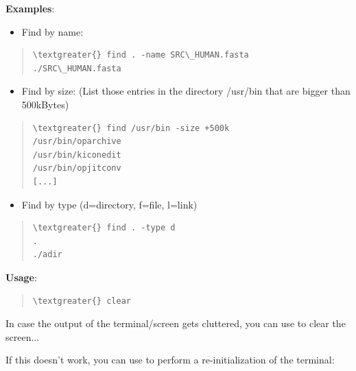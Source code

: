 \documentclass[letterpaper,10pt,english]{sphinxmanual}
\begin{document}
\textbf{Examples}:
\begin{itemize}
\item {} 
Find by name:

\end{itemize}
\begin{quote}

\begin{Verbatim}[commandchars=\\\{\}]
\textgreater{} find . -name SRC\_HUMAN.fasta
./SRC\_HUMAN.fasta
\end{Verbatim}
\end{quote}
\begin{itemize}
\item {} 
Find by size: (List those entries in the directory /usr/bin that are bigger than 500kBytes)

\end{itemize}
\begin{quote}

\begin{Verbatim}[commandchars=\\\{\}]
\textgreater{} find /usr/bin -size +500k
/usr/bin/oparchive
/usr/bin/kiconedit
/usr/bin/opjitconv
[...]
\end{Verbatim}
\end{quote}
\begin{itemize}
\item {} 
Find by type (d=directory, f=file, l=link)

\end{itemize}
\begin{quote}

\begin{Verbatim}[commandchars=\\\{\}]
\textgreater{} find . -type d
.
./adir
\end{Verbatim}
\end{quote}

\textbf{Usage}:  
\begin{quote}

\begin{Verbatim}[commandchars=\\\{\}]
\textgreater{} clear
\end{Verbatim}
\end{quote}

In case the output of the terminal/screen gets cluttered, you can use  to clear the screen...

If this doesn't work, you can use  to perform a re-initialization of the terminal:
\end{document}
